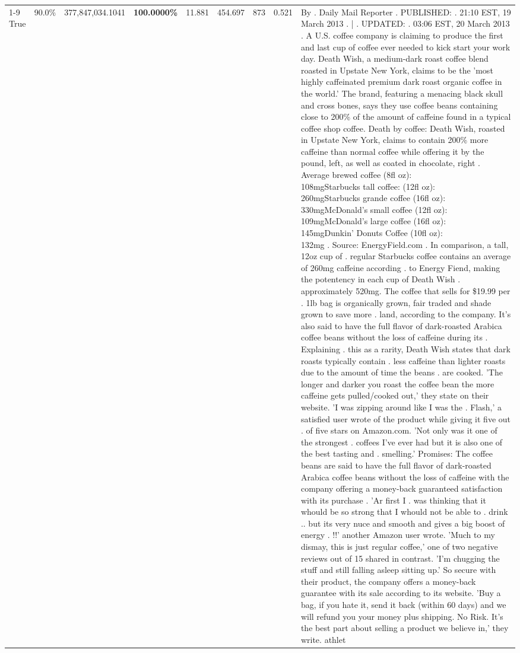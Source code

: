 \begin{table}[H]
{\begin{tabular}{lllrlllll}
\cline{1-9}
True & 90.0\% & 377,847,034.1041 & \bfseries \color{red} 100.0000\% & 11.881 & 454.697 & 873 & 0.521 & By . Daily Mail Reporter . PUBLISHED: . 21:10 EST, 19 March 2013 . | . UPDATED: . 03:06 EST, 20 March 2013 . A U.S. coffee company is claiming to produce the first and last cup of coffee ever needed to kick start your work day. Death Wish, a medium-dark roast coffee blend roasted in Upstate New York, claims to be the 'most highly caffeinated premium dark roast organic coffee in the world.' The brand, featuring a menacing black skull and cross bones, says they use coffee beans containing close to 200\% of the amount of caffeine found in a typical coffee shop coffee. Death by coffee: Death Wish, roasted in Upstate New York, claims to contain 200\% more caffeine than normal coffee while offering it by the pound, left, as well as coated in chocolate, right . Average brewed coffee (8fl oz):              108mgStarbucks tall coffee: (12fl oz):                260mgStarbucks grande coffee (16fl oz):         330mgMcDonald's small coffee (12fl oz):           109mgMcDonald's large coffee (16fl oz):           145mgDunkin' Donuts Coffee (10fl oz):             132mg . Source: EnergyField.com . In comparison, a tall, 12oz cup of . regular Starbucks coffee contains an average of 260mg caffeine according . to Energy Fiend, making the potentency in each cup of Death Wish . approximately 520mg. The coffee that sells for \$19.99 per . 1lb bag is organically grown, fair traded and shade grown to save more . land, according to the company. It's also said to have the full flavor of dark-roasted Arabica coffee beans without the loss of caffeine during its . Explaining . this as a rarity, Death Wish states that dark roasts typically contain . less caffeine than lighter roasts due to the amount of time the beans . are cooked. 'The longer and darker you roast the coffee bean the more caffeine gets pulled/cooked out,' they state on their website. 'I was zipping around like I was the . Flash,' a satisfied user wrote of the product while giving it five out . of five stars on Amazon.com. 'Not only was it one of the strongest . coffees I've ever had but it is also one of the best tasting and . smelling.’ Promises: The coffee beans are said to have the full flavor of dark-roasted Arabica coffee beans without the loss of caffeine with the company offering a money-back guaranteed satisfaction with its purchase . 'Ar first I . was thinking that it whould be so strong that I whould not be able to . drink .. but its very nuce and smooth and gives a big boost of energy . !!' another Amazon user wrote. 'Much to my dismay, this is just regular coffee,' one of two negative reviews out of 15 shared in contrast. 'I'm chugging the stuff and still falling asleep sitting up.' So secure with their product, the company offers a money-back guarantee with its sale according to its website. 'Buy a bag, if you hate it, send it back (within 60 days) and we will refund you your money plus shipping. No Risk. It’s the best part about selling a product we believe in,' they write. athlet \\

\end{tabular}}
\end{table}
